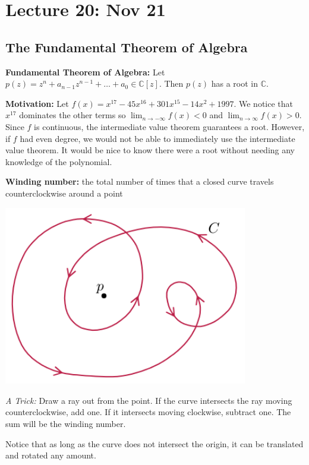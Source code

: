 \documentclass[12pt]{report}
\newcommand{\C}{\mathbb{C}}
\begin{document}
\section*{Lecture 20: Nov 21}
    \subsection*{The Fundamental Theorem of Algebra}
        \textbf{Fundamental Theorem of Algebra:} Let $p(z) = z^n + a_{n-1} z^{n-1} + \dots + a_0 \in \C[z]$. Then $p(z)$ has a root in $\C$. 

        \textbf{Motivation:} Let $f(x) = x^{17} - 45x^{16} + 301x^{15} - 14x^2 + 1997$. We notice that $x^{17}$ dominates the other terms so $\lim_{n\to-\infty} f(x) < 0$ and $\lim_{n \to \infty} f(x) > 0$. Since $f$ is continuous, the intermediate value theorem guarantees a root. However, if $f$ had even degree, we would not be able to immediately use the intermediate value theorem. It would be nice to know there were a root without needing any knowledge of the polynomial. 

        \textbf{Winding number:} the total number of times that a closed curve travels counterclockwise around a point 

        \begin{center}
            \includegraphics[width=0.8\textwidth]{Images/winding number.png}
        \end{center}

        \emph{A Trick:} Draw a ray out from the point. If the curve intersects the ray moving counterclockwise, add one. If it intersects moving clockwise, subtract one. The sum will be the winding number. 

        Notice that as long as the curve does not intersect the origin, it can be translated and rotated any amount. 
\end{document}

